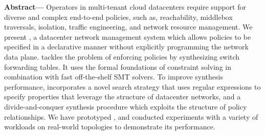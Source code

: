 
  {\bf Abstract---} Operators in multi-tenant cloud datacenters
  require support for diverse and complex end-to-end policies, such
  as, reachability, middlebox traversals, isolation, traffic
  engineering, and network resource management. We present \Name, a
  datacenter network management system which allows policies to be
  specified in a declarative manner without explicitly programming the
  network data plane.  \name tackles the problem of enforcing policies
  by synthesizing switch forwarding tables. It uses the formal
  foundations of constraint solving in combination with fast
  off-the-shelf SMT solvers.  To improve synthesis performance, \Name
  incorporates a novel search strategy that uses regular expressions
  to specify properties that leverage the structure of datacenter
  networks,
  and a divide-and-conquer synthesis procedure which exploits the
  structure of policy relationships.  We have prototyped \Name, and conducted
  experiments with a variety of workloads on real-world topologies
  to demonstrate its  performance.
